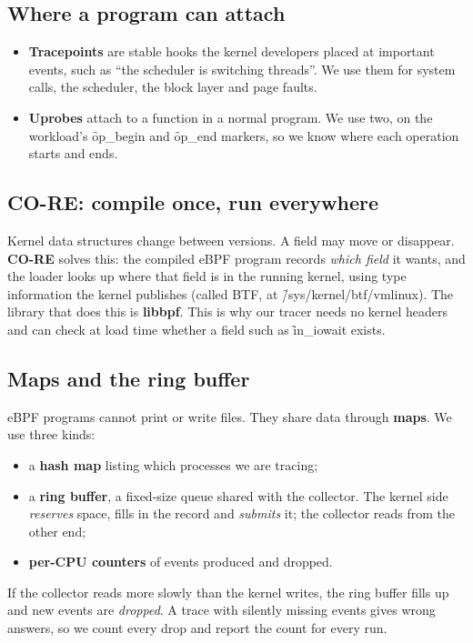 \documentclass[11pt]{article}
\begin{document}
\subsection{Where a program can attach}
\begin{itemize}
\item \textbf{Tracepoints} are stable hooks the kernel developers placed at important events, such as ``the scheduler is switching threads''. We use them for system calls, the scheduler, the block layer and page faults.
\item \textbf{Uprobes} attach to a function in a normal program. We use two, on the workload's \f{op\_begin} and \f{op\_end} markers, so we know where each operation starts and ends.
\end{itemize}

\subsection{CO-RE: compile once, run everywhere}
Kernel data structures change between versions. A field may move or disappear. \textbf{CO-RE} solves this: the compiled eBPF program records \emph{which field} it wants, and the loader looks up where that field is in the running kernel, using type information the kernel publishes (called BTF, at \f{/sys/kernel/btf/vmlinux}). The library that does this is \textbf{libbpf}. This is why our tracer needs no kernel headers and can check at load time whether a field such as \f{in\_iowait} exists.

\subsection{Maps and the ring buffer}
eBPF programs cannot print or write files. They share data through \textbf{maps}. We use three kinds:
\begin{itemize}
\item a \textbf{hash map} listing which processes we are tracing;
\item a \textbf{ring buffer}, a fixed-size queue shared with the collector. The kernel side \emph{reserves} space, fills in the record and \emph{submits} it; the collector reads from the other end;
\item \textbf{per-CPU counters} of events produced and dropped.
\end{itemize}

If the collector reads more slowly than the kernel writes, the ring buffer fills up and new events are \emph{dropped}. A trace with silently missing events gives wrong answers, so we count every drop and report the count for every run.
\end{document}
